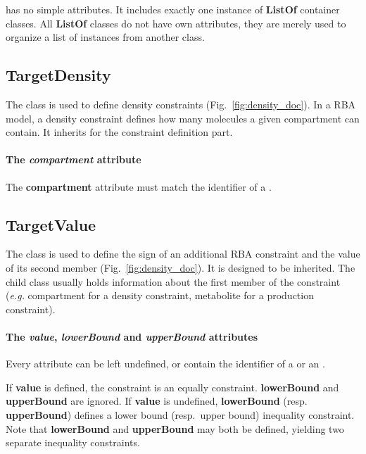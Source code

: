 \rbadensity{} has no simple attributes.
It includes exactly one instance of \textbf{ListOf} container classes.
All \textbf{ListOf} classes do not have own attributes,
they are merely used to organize a list of instances from another class.

\subsection{TargetDensity}
\label{sec:target_density}

The \targetdensity{} class is used to define density constraints
(Fig.~\ref{fig:density_doc}).
In a RBA model, a density constraint defines how many molecules
a given compartment can contain.
It inherits \targetvalue{} for the constraint definition part.

\paragraph{The \textit{compartment} attribute}
The \textbf{compartment} attribute must match the identifier of a \compartment.


\subsection{TargetValue}
\label{sec:target_value}

The \targetvalue{} class is used to define the sign of an additional RBA
constraint and the value of its second member
(Fig.~\ref{fig:density_doc}).
It is designed to be inherited.
The child class usually holds information about the first member of the
constraint
(\textit{e.g.} compartment for a density constraint,
metabolite for a production constraint).

\paragraph{The \textit{value}, \textit{lowerBound} and \textit{upperBound} attributes}
Every attribute can be left undefined, or
contain the identifier of a \function{} or an \aggregate.

If \textbf{value} is defined, the constraint is an equally constraint.
\textbf{lowerBound} and \textbf{upperBound} are ignored.
If \textbf{value} is undefined, \textbf{lowerBound} (resp. \textbf{upperBound}) defines
a lower bound (resp.\ upper bound) inequality constraint.
Note that \textbf{lowerBound} and \textbf{upperBound} may both be defined, yielding two
separate inequality constraints.

